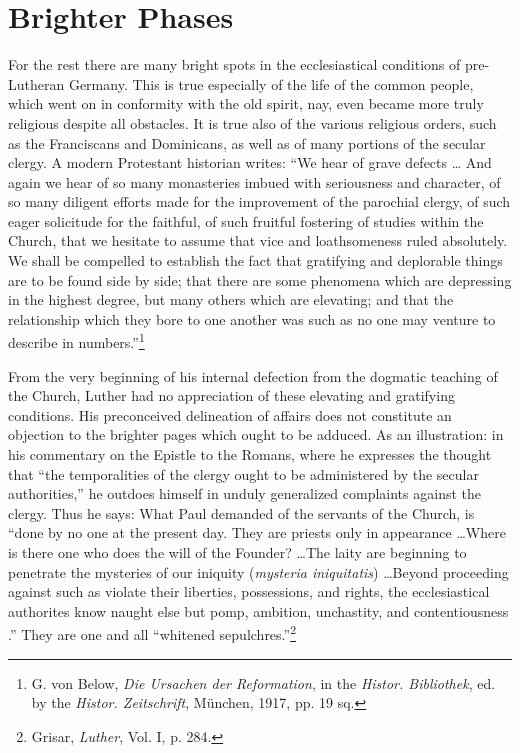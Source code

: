 \section{Brighter Phases}

For the rest there are many bright spots in the ecclesiastical conditions of pre-Lutheran Germany. This is true especially of the life
of the common people, which went on in conformity with the old
spirit, nay, even became more truly religious despite all obstacles. It
is true also of the various religious orders, such as the Franciscans and
Dominicans, as well as of many portions of the secular clergy. A
modern Protestant historian writes: “We hear of grave defects \dots
And again we hear of so many monasteries imbued with seriousness
and character, of so many diligent efforts made for the improvement of
the parochial clergy, of such eager solicitude for the faithful, of such
fruitful fostering of studies within the Church, that we
hesitate to assume that vice and loathsomeness ruled absolutely. We
shall be compelled to establish the fact that gratifying and deplorable
things are to be found side by side; that there are some phenomena
which are depressing in the highest degree, but many others which are
elevating; and that the relationship which they bore to one another
was such as no one may venture to describe in numbers.”\footnote
{G. von Below, \textit{Die Ursachen der Reformation}, in the \textit{Histor. Bibliothek}, ed. by the
\textit{Histor. Zeitschrift}, München, 1917, pp. 19 sq.}

From the very beginning of his internal defection from the dogmatic teaching
of the Church, Luther had no appreciation of these
elevating and gratifying conditions. His preconceived delineation of
affairs does not constitute an objection to the brighter pages which
ought to be adduced.
As an illustration: in his commentary on the Epistle to the Romans,
where he expresses the thought that “the temporalities of the clergy ought
to be administered by the secular authorities,” he outdoes himself in unduly
generalized complaints against the clergy. Thus he says: What Paul demanded
of the servants of the Church, is “done by no one at the present
day. They are priests only in appearance \dots Where is there one who
does the will of the Founder? \dots The laity are beginning to penetrate
the mysteries of our iniquity (\textit{mysteria iniquitatis}) \dots Beyond proceeding
against such as violate their liberties, possessions, and rights, the ecclesiastical
authorites know naught else but pomp, ambition, unchastity, and contentiousness
.” They are one and all “whitened sepulchres.”\footnote{Grisar, \textit{Luther}, Vol. I, p. 284.}

